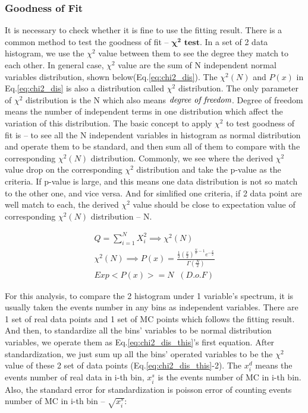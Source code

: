 		\subsubsection{Goodness of Fit}
		\label{sssec:GoF}

		It is necessary to check whether it is fine to use the fitting result. There is a common method to test the goodness of fit -- $\boldsymbol{\chi^2}$ $\textbf{test}$. In a set of 2 data histogram, we use the $\chi^2$ value between them to see the degree they match to each other. In general case, $\chi^2$ value are the sum of N independent normal variables distribution, shown below(Eq.\ref{eq:chi2_dis}). The $\chi^2(N)$ and $P(x)$ in Eq.\ref{eq:chi2_dis} is also a distribution called $\chi^2$ distribution. The only parameter of $\chi^2$ distribution is the N which also means $\emph{degree of freedom}$. Degree of freedom means the number of independent terms in one distribution which affect the variation of this distribution. 
		The basic concept to apply $\chi^2$ to test goodness of fit is -- to see all the N independent variables in histogram as normal distribution and operate them to be standard, and then sum all of them to compare with the corresponding $\chi^2(N)$ distribution. Commonly, we see where the derived $\chi^2$ value drop on the corresponding $\chi^2$ distribution and take the p-value as the criteria. If p-value is large, and this means one data distribution is not so match to the other one, and vice versa. And for simlified one criteria, if 2 data point are well match to each, the derived $\chi^2$ value should be close to expectation value of corresponding $\chi^2(N)$ distribution -- N.

		\begin{equation}
		\begin{split}
		Q = \sum_{i=1}^{N} X_i^2 \implies \chi^2(N) \\ %
		\chi^2(N) \implies P(x) = \frac{\frac{1}{2}(\frac{x}{2})^{\frac{N}{2} - 1}e^{-\frac{x}{2}}}{\Gamma (\frac{N}{2})} \\
		Exp<P(x)> = N \; \; (D.o.F)
		\label{eq:chi2_dis}
		\end{split}
		\end{equation}

		For this analysis, to compare the 2 histogram under 1 variable's spectrum, it is usually taken the events number in any bins as independent variables. There are 1 set of real data points and 1 set of MC points which follows the fitting result. And then, to standardize all the bins' variables to be normal distribution variables, we operate them as Eq.\ref{eq:chi2_dis_this}'s first equation. After standardization, we just sum up all the bins' operated variables to be the $\chi^2$ value of these 2 set of data points (Eq.\ref{eq:chi2_dis_this}-2). The $x^d_i$ means the events number of real data in i-th bin, $x^s_i$ is the events number of MC in i-th bin. Also, the standard error for standardization is poisson error of counting events number of MC in i-th bin -- $\sqrt{x^s_i}$:

